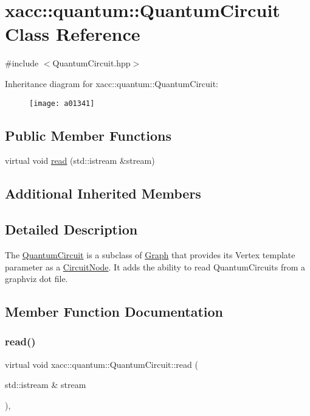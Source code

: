 \hypertarget{a01341}{}\section{xacc\+:\+:quantum\+:\+:Quantum\+Circuit Class Reference}
\label{a01341}


{\ttfamily \#include $<$Quantum\+Circuit.\+hpp$>$}

Inheritance diagram for xacc\+:\+:quantum\+:\+:Quantum\+Circuit\+:\begin{figure}[H]
\begin{center}
\leavevmode
\texttt{[image: a01341]}
\end{center}
\end{figure}
\subsection*{Public Member Functions}
\begin{DoxyCompactItemize}
\item 
virtual void \hyperlink{a01341_af7a7f4a487d493fe8a4ed1f76cefd731}{read} (std\+::istream \&stream)
\end{DoxyCompactItemize}
\subsection*{Additional Inherited Members}


\subsection{Detailed Description}
The \hyperlink{a01341}{Quantum\+Circuit} is a subclass of \hyperlink{a01713}{Graph} that provides its Vertex template parameter as a \hyperlink{a01261}{Circuit\+Node}. It adds the ability to read Quantum\+Circuits from a graphviz dot file. 

\subsection{Member Function Documentation}
\mbox{\label{a01341_af7a7f4a487d493fe8a4ed1f76cefd731}} 
\subsubsection{\texorpdfstring{read()}{read()}}
{\footnotesize\ttfamily virtual void xacc\+::quantum\+::\+Quantum\+Circuit\+::read (\begin{DoxyParamCaption}\item[{std\+::istream \&}]{stream }\end{DoxyParamCaption})\hspace{0.3cm}{\ttfamily [inline]}, {\ttfamily [virtual]}}

